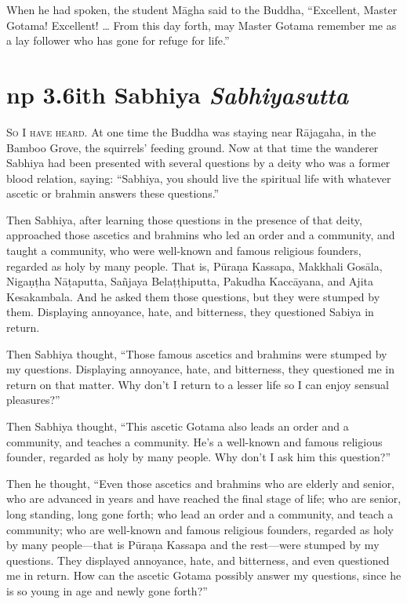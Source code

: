 \documentclass[12pt,openany]{book}%
\newcommand*{\suttatitleacronym}[1]{\smaller[2]{#1}\vspace*{.3em}}
\newcommand*{\suttatitletranslation}[1]{\linebreak{#1}}
\newcommand*{\suttatitleroot}[1]{\linebreak\smaller[2]\itshape{#1}}
\newcommand*{\tocacronym}[1]{\hspace*{-3.3em}{#1}\quad}
\newcommand*{\toctranslation}[1]{#1}
\newcommand*{\tocroot}[1]{(\textit{#1})}
\newcommand*{\scevam}[1]{\textsc{#1}}
\begin{document}
When he had spoken, the student \textsanskrit{Māgha} said to the Buddha, “Excellent, Master Gotama! Excellent! … From this day forth, may Master Gotama remember me as a lay follower who has gone for refuge for life.” 

%
\section*{{\suttatitleacronym Snp 3.6}{\suttatitletranslation With Sabhiya }{\suttatitleroot Sabhiyasutta}}
\addcontentsline{toc}{section}{\tocacronym{Snp 3.6} \toctranslation{With Sabhiya } \tocroot{Sabhiyasutta}}

\scevam{So I have heard. }At one time the Buddha was staying near \textsanskrit{Rājagaha}, in the Bamboo Grove, the squirrels’ feeding ground. Now at that time the wanderer Sabhiya had been presented with several questions by a deity who was a former blood relation, saying: “Sabhiya, you should live the spiritual life with whatever ascetic or brahmin answers these questions.” 

Then Sabhiya, after learning those questions in the presence of that deity, approached those ascetics and brahmins who led an order and a community, and taught a community, who were well-known and famous religious founders, regarded as holy by many people. That is, \textsanskrit{Pūraṇa} Kassapa, Makkhali \textsanskrit{Gosāla}, \textsanskrit{Nigaṇṭha} \textsanskrit{Nāṭaputta}, \textsanskrit{Sañjaya} \textsanskrit{Belaṭṭhiputta}, Pakudha \textsanskrit{Kaccāyana}, and Ajita Kesakambala. And he asked them those questions, but they were stumped by them. Displaying annoyance, hate, and bitterness, they questioned Sabiya in return. 

Then Sabhiya thought, “Those famous ascetics and brahmins were stumped by my questions. Displaying annoyance, hate, and bitterness, they questioned me in return on that matter. Why don’t I return to a lesser life so I can enjoy sensual pleasures?” 

Then Sabhiya thought, “This ascetic Gotama also leads an order and a community, and teaches a community. He’s a well-known and famous religious founder, regarded as holy by many people. Why don’t I ask him this question?” 

Then he thought, “Even those ascetics and brahmins who are elderly and senior, who are advanced in years and have reached the final stage of life; who are senior, long standing, long gone forth; who lead an order and a community, and teach a community; who are well-known and famous religious founders, regarded as holy by many people—that is \textsanskrit{Pūraṇa} Kassapa and the rest—were stumped by my questions. They displayed annoyance, hate, and bitterness, and even questioned me in return. How can the ascetic Gotama possibly answer my questions, since he is so young in age and newly gone forth?” 
\end{document}
